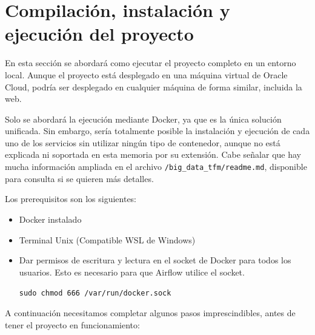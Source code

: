 \clearpage
\section{Compilación, instalación y ejecución del proyecto}\label{sec:instalacion_despliegue}

En esta sección se abordará como ejecutar el proyecto completo en un entorno local. Aunque el proyecto está desplegado en una máquina virtual de Oracle Cloud, podría ser desplegado en cualquier máquina de forma similar, incluida la web.

Solo se abordará la ejecución mediante Docker, ya que es la única solución unificada. Sin embargo, sería totalmente posible la instalación y ejecución de cada uno de los servicios sin utilizar ningún tipo de contenedor, aunque no está explicada ni soportada en esta memoria por su extensión. Cabe señalar que hay mucha información ampliada en el archivo \texttt{/big\_data\_tfm/readme.md}, disponible para consulta si se quieren más detalles.

Los prerequisitos son los siguientes:

\begin{itemize}
    \item Docker instalado
    \item Terminal Unix (Compatible WSL de Windows)
    \item Dar permisos de escritura y lectura en el socket de Docker para todos los usuarios. Esto es necesario para que Airflow utilice el socket. 
    
    \texttt{sudo chmod 666 /var/run/docker.sock}
    
\end{itemize}

A continuación necesitamos completar algunos pasos imprescindibles, antes de tener el proyecto en funcionamiento:

